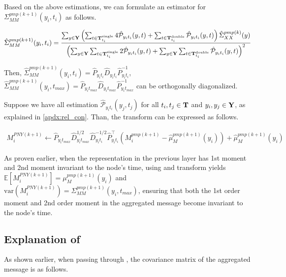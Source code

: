 Based on the above estimations, we can formulate an estimator for ${\Sigma}_{MM}^{pmp(k+1)}(y_i, t_i)$ as follows.

\begin{align}
\hat{\Sigma}^{pmp(k+1)}_{MM}(y_i,t_i) = {\sum_{y\in \bold{Y}}\left(\sum_{t\in\bold{T}_{t_i}^{\text{single}}}4\hat{\mathcal{P}}_{y_i t_i}(y, t)+\sum_{t\in\bold{T}_{t_i}^{\text{double}}}\hat{\mathcal{P}}_{y_i t_i}(y, t)\right)\hat\Sigma_{XX}^{pmp(k)}(y)
\over
\left(\sum_{y\in \bold{Y}}\sum_{t\in\bold{T}_{t_i}^{\text{single}}}2\hat{\mathcal{P}}_{y_i t_i}(y, t)+\sum_{y\in \bold{Y}}\sum_{t\in\bold{T}_{t_i}^{\text{double}}}\hat{\mathcal{P}}_{y_i t_i}(y, t)\right)^2}
\end{align}

Then, $\hat\Sigma^{pmp(k+1)}_{MM}(y_i,t_i)=\hat P_{y_i t_i}\hat D_{y_i t_i} \hat P_{y_i t_i}^{-1}$, $\hat\Sigma^{pmp(k+1)}_{MM}(y_i,t_{max})=\hat P_{y_i t_{max}}\hat D_{y_it_{max}} \hat P_{y_it_{max}}^{-1}$ can be orthogonally diagonalized.

Suppose we have all estimation $\hat{\mathcal P}_{y_i t_i}(y_j, t_j)$ for all $t_i, t_j \in \bold{T}$ and $y_i, y_j\in \bold{Y}$, as explained in \ref{apdx:rel_con}. Than, the \PNY transform can be expressed as follows.

\begin{align}
M_i^{PNY(k+1)}\leftarrow  \hat P_{y_i t_{max}}\hat D_{y_i t_{max}}^{1/2}\hat D_{y_i t_i}^{-1/2}\hat P_{y_i t_i}^{\top}(M_i^{pmp (k+1)}-\hat\mu_{M}^{pmp(k+1)}(y_i))+\hat \mu_{M}^{pmp(k+1)}(y_i)
\end{align}

As proven earlier, when the representation in the previous layer has 1st moment and 2nd moment invariant to the node's time, using \PMP and \PNY transform yields $\mathbb{E}[M_i^{PNY(k+1)}]=\mu_{M}^{pmp(k+1)}(y_i)$ and $\text{var}(M_i^{PNY(k+1)})=\Sigma^{pmp(k+1)}_{MM}(y_i,t_{max})$, ensuring that both the 1st order moment and 2nd order moment in the aggregated message become invariant to the node's time.














\subsection{Explanation of \JJnorm}
\label{apdx:JJnorm}
As shown earlier, when passing through \PMP, the covariance matrix of the aggregated message is as follows.

